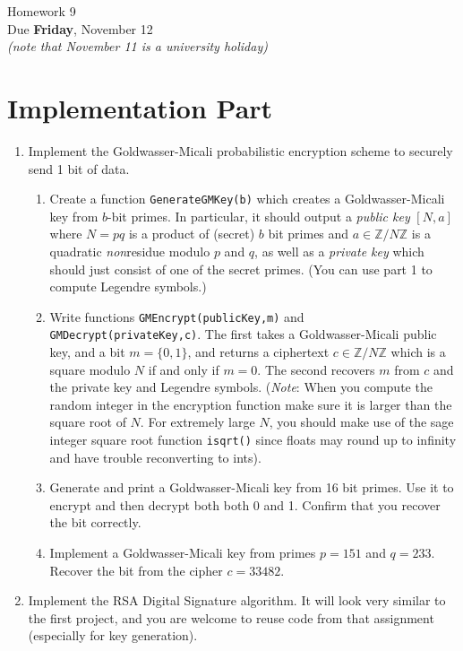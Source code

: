 \documentclass[11pt]{article}
\newcommand{\bZ}{\mathbb{Z}}
\begin{document}
\begin{center}
\Large {Homework 9}\\
\small {Due \textbf{Friday}, November 12}\\
\scriptsize {\textit{(note that November 11 is a university holiday)}}
\end{center}
\section*{Implementation Part}
\begin{enumerate}
  \item{
  Implement the Goldwasser-Micali probabilistic encryption scheme to securely send 1 bit of data.
  \begin{enumerate}
    \item{
    Create a function \verb|GenerateGMKey(b)| which creates a Goldwasser-Micali key from $b$-bit primes.  In particular, it should output a \textit{public key} $[N,a]$ where $N = pq$ is a product of (secret) $b$ bit primes and $a\in\bZ/N\bZ$ is a quadratic \textit{non}residue modulo $p$ and $q$, as well as a \textit{private key} which should just consist of one of the secret primes.  (You can use part 1 to compute Legendre symbols.)
    }
    \item{
    Write functions \verb|GMEncrypt(publicKey,m)| and \verb|GMDecrypt(privateKey,c)|.  The first takes a Goldwasser-Micali public key, and a bit $m = \{0,1\}$, and returns a ciphertext $c\in\bZ/N\bZ$ which is a square modulo $N$ if and only if $m=0$. The second recovers $m$ from $c$ and the private key and Legendre symbols.  (\textit{Note}: When you compute the random integer in the encryption function make sure it is larger than the square root of $N$.  For extremely large $N$, you should make use of the sage integer square root function \verb|isqrt()| since floats may round up to infinity and have trouble reconverting to ints).
    }
    \item{
    Generate and print a Goldwasser-Micali key from 16 bit primes.  Use it to encrypt and then decrypt both both 0 and 1.  Confirm that you recover the bit correctly.
    }
    \item{
    Implement a Goldwasser-Micali key from primes $p=151$ and $q=233$.  Recover the bit from the cipher $c = 33482$.
    }
  \end{enumerate}
  }
  \item{
  Implement the RSA Digital Signature algorithm.  It will look very similar to the first project, and you are welcome to reuse code from that assignment (especially for key generation).
}
\end{enumerate}
\end{document}
